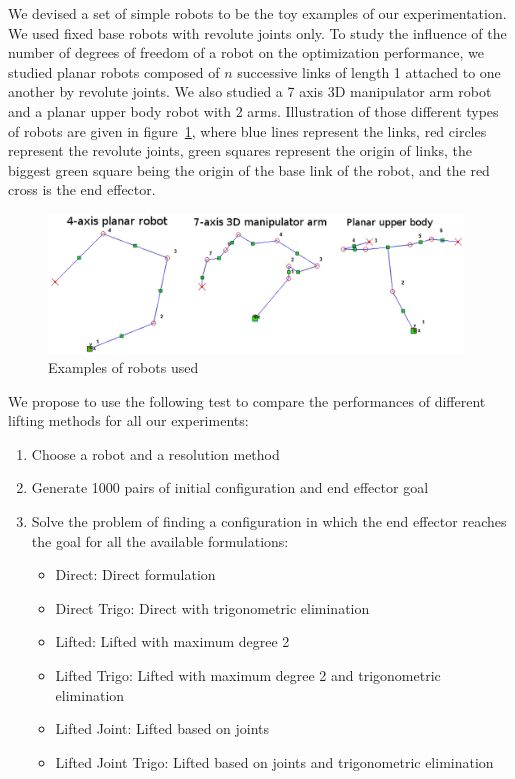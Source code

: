 We devised a set of simple robots to be the toy examples of our experimentation.
We used fixed base robots with revolute joints only.
To study the influence of the number of degrees of freedom of a robot on the optimization performance, we studied planar robots composed of $n$ successive links of length 1 attached to one another by revolute joints.
We also studied a 7 axis 3D manipulator arm robot and a planar upper body robot with 2 arms.
Illustration of those different types of robots are given in figure~\ref{fig:robots}, where blue lines represent the links, red circles represent the revolute joints, green squares represent the origin of links, the biggest green square being the origin of the base link of the robot, and the red cross is the end effector.
\begin{figure}
  \centering
  \includegraphics[width=0.98\textwidth]{robots.png}
  \caption{Examples of robots used}
\label{fig:robots}
\end{figure}

We propose to use the following test to compare the performances of different lifting methods for all our experiments:
\begin{enumerate}
  \item Choose a robot and a resolution method
  \item Generate 1000 pairs of initial configuration and end effector goal
  \item Solve the problem of finding a configuration in which the end effector reaches the goal for all the available formulations:
  \begin{itemize}
    \item Direct: Direct formulation
    \item Direct Trigo: Direct with trigonometric elimination
    \item Lifted: Lifted with maximum degree 2
    \item Lifted Trigo: Lifted with maximum degree 2 and trigonometric elimination
    \item Lifted Joint: Lifted based on joints
    \item Lifted Joint Trigo: Lifted based on joints and trigonometric elimination
  \end{itemize}
\end{enumerate}

